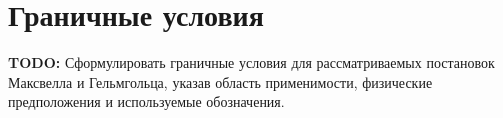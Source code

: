 \section{Граничные условия}
\label{sec:boundary-conditions}

\textbf{TODO:} Сформулировать граничные условия для рассматриваемых
постановок Максвелла и Гельмгольца, указав область применимости,
физические предположения и используемые обозначения.
